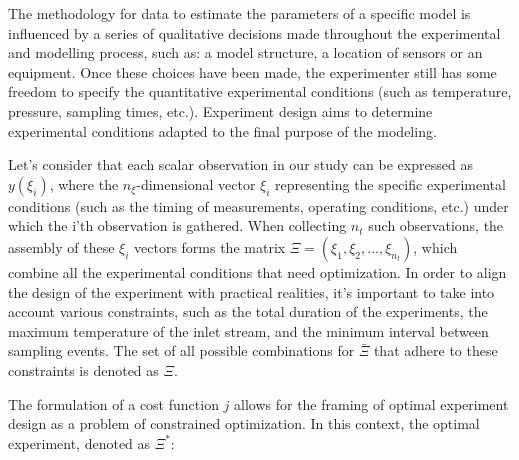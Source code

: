 \documentclass[]{scrartcl}
\begin{document}
The methodology for data to estimate the parameters of a specific model is influenced by a series of qualitative decisions made throughout the experimental and modelling process, such as: a model structure, a location of sensors or an equipment. Once these choices have been made, the experimenter still has some freedom to specify the quantitative experimental conditions (such as temperature, pressure, sampling times, etc.). Experiment design aims to determine experimental conditions adapted to the final purpose of the modeling. 


Let's consider that each scalar observation in our study can be expressed as $y(\xi_i)$, where the $n_\xi$-dimensional vector $\xi_i$ representing the specific experimental conditions (such as the timing of measurements, operating conditions, etc.) under which the i'th observation is gathered. When collecting $n_t$ such observations, the assembly of these $\xi_i$ vectors forms the matrix $\Xi = (\xi_1, \xi_2,..., \xi_{n_t})$, which combine all the experimental conditions that need optimization. In order to align the design of the experiment with practical realities, it's important to take into account various constraints, such as the total duration of the experiments, the maximum temperature of the inlet stream, and the minimum interval between sampling events. The set of all possible combinations for $\bar{\Xi}$ that adhere to these constraints is denoted as $\Xi$.


The formulation of a cost function $j$ allows for the framing of optimal experiment design as a problem of constrained optimization. In this context, the optimal experiment, denoted as $\Xi^*$:
\end{document}
